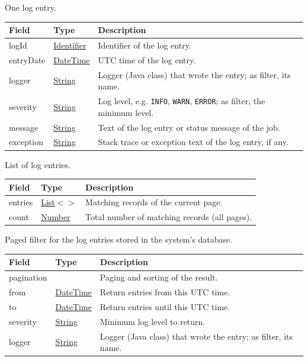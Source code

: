 \documentclass[a4paper]{arrowhead}
\newcommand{\mref}[2][]{{\textcolor{ArrowheadPurple}{\hyperref[sec:model:#2]{\ifstrempty{#1}{#2}{#1}}}}}
\newcommand{\pref}[1]{{\textcolor{ArrowheadGrey}{\hyperref[sec:model:primitives:#1]{#1}}}}
\begin{document}

One log entry.


\noindent\begin{tabularx}{\textwidth}{| >{\raggedright\arraybackslash}p{3.9cm} | >{\raggedright\arraybackslash\small}p{5.3cm} | X |} \hline
\rowcolor{gray!33} Field & Type & Description \\ \hline
log\allowbreak{}Id & \pref{Identifier} & Identifier of the log entry. \\ \hline
entry\allowbreak{}Date & \pref{DateTime} & UTC time of the log entry. \\ \hline
logger & \pref{String} & Logger (Java class) that wrote the entry; as filter, its name. \\ \hline
severity & \pref{String} & Log level, e.g. \texttt{INFO}, \texttt{WARN}, \texttt{ERROR}; as filter, the minimum level. \\ \hline
message & \pref{String} & Text of the log entry or status message of the job. \\ \hline
exception & \pref{String} & Stack trace or exception text of the log entry, if any. \\ \hline
\end{tabularx}




List of log entries.


\noindent\begin{tabularx}{\textwidth}{| >{\raggedright\arraybackslash}p{3.9cm} | >{\raggedright\arraybackslash\small}p{5.3cm} | X |} \hline
\rowcolor{gray!33} Field & Type & Description \\ \hline
entries & \pref{List}$<$\allowbreak{}\mref{LogEntry}$>$ & Matching records of the current page. \\ \hline
count & \pref{Number} & Total number of matching records (all pages). \\ \hline
\end{tabularx}




Paged filter for the log entries stored in the system's database.


\noindent\begin{tabularx}{\textwidth}{| >{\raggedright\arraybackslash}p{3.9cm} | >{\raggedright\arraybackslash\small}p{5.3cm} | X |} \hline
\rowcolor{gray!33} Field & Type & Description \\ \hline
pagination & \mref{Page} & Paging and sorting of the result. \\ \hline
from & \pref{DateTime} & Return entries from this UTC time. \\ \hline
to & \pref{DateTime} & Return entries until this UTC time. \\ \hline
severity & \pref{String} & Minimum log level to return. \\ \hline
logger & \pref{String} & Logger (Java class) that wrote the entry; as filter, its name. \\ \hline
\end{tabularx}
\end{document}
